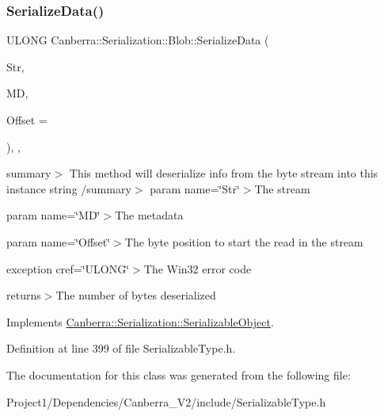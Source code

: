 \subsubsection{\texorpdfstring{Serialize\+Data()}{SerializeData()}}
{\footnotesize\ttfamily U\+L\+O\+NG Canberra\+::\+Serialization\+::\+Blob\+::\+Serialize\+Data (\begin{DoxyParamCaption}\item[{\hyperlink{class_canberra_1_1_utility_1_1_core_1_1_byte_stream}{Canberra\+::\+Utility\+::\+Core\+::\+Byte\+Stream} \&}]{Str,  }\item[{const \hyperlink{class_canberra_1_1_serialization_1_1_meta_data}{Meta\+Data} \&}]{MD,  }\item[{const L\+O\+NG}]{Offset = {} }\end{DoxyParamCaption})\hspace{0.3cm}{\ttfamily [inline]}, {\ttfamily [protected]}, {\ttfamily [virtual]}}

summary$>$ This method will deserialize info from the byte stream into this instance string /summary$>$ param name=\char`\"{}\+Str\char`\"{}$>$The stream

param name=\char`\"{}\+M\+D\char`\"{}$>$The metadata

param name=\char`\"{}\+Offset\char`\"{}$>$The byte position to start the read in the stream

exception cref=\char`\"{}\+U\+L\+O\+N\+G\char`\"{}$>$The Win32 error code

returns$>$The number of bytes deserialized

Implements \hyperlink{class_canberra_1_1_serialization_1_1_serializable_object}{Canberra\+::\+Serialization\+::\+Serializable\+Object}.



Definition at line 399 of file Serializable\+Type.\+h.



The documentation for this class was generated from the following file\+:\begin{DoxyCompactItemize}
\item 
Project1/\+Dependencies/\+Canberra\+\_\+\+V2/include/Serializable\+Type.\+h\end{DoxyCompactItemize}
